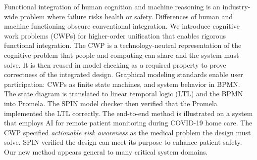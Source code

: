 Functional integration of human cognition and machine reasoning is an industry-wide problem where failure risks health or safety. 
Differences of human and machine functioning obscure conventional integration.
We introduce cognitive work problems (CWPs) for higher-order unification that enables rigorous functional integration. 
The CWP is a technology-neutral representation of the cognitive problem that people and computing can share and the system must solve.
It is then reused in model checking as a required property to prove correctness of the integrated design.
Graphical modeling standards enable user participation: CWPs as finite state machines, and system behavior in BPMN.
The state diagram is translated to linear temporal logic (LTL) and the BPMN into Promela. 
The SPIN model checker then verified that the Promela implemented the LTL correctly. 
The end-to-end method is illustrated on a system that employs AI for remote patient monitoring during COVID-19 home care. The CWP specified \emph{actionable risk awareness} as the medical problem the design must solve. 
SPIN verified the design can meet its purpose to enhance patient safety. 
Our new method appears general to many critical system domains.
